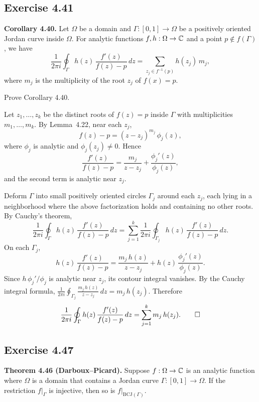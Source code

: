 \documentclass{article}
\begin{document}
\subsection{Exercise 4.41}

\textbf{Corollary 4.40.}
Let $\Omega$ be a domain and $\Gamma : [0, 1] \to \Omega$ be a
positively oriented Jordan curve inside $\Omega$.  For analytic
functions $f, h : \Omega \to \mathbb{C}$ and a point $p \notin f(\Gamma)$, we
have
\[
  \frac{1}{2\pi i} \oint_\Gamma h(z)\,\frac{f'(z)}{f(z) - p}\,dz
  = \sum_{z_j \in f^{-1}(p)} h(z_j)\,m_j,
\]
where $m_j$ is the multiplicity of the root $z_j$ of $f(x) = p$.

Prove Corollary 4.40.

\begin{solution}
  Let $z_1, \ldots, z_k$ be the distinct roots of $f(z) = p$
  inside $\Gamma$ with multiplicities $m_1, \ldots, m_k$.
  By Lemma~4.22, near each $z_j$,
  \[
    f(z) - p = (z - z_j)^{m_j}\,\phi_j(z),
  \]
  where $\phi_j$ is analytic and $\phi_j(z_j) \ne 0$.
  Hence
  \[
    \frac{f'(z)}{f(z) - p}
    = \frac{m_j}{z - z_j} + \frac{\phi_j'(z)}{\phi_j(z)},
  \]
  and the second term is analytic near $z_j$.

  Deform $\Gamma$ into small positively oriented circles
  $\Gamma_j$ around each $z_j$, each lying in a neighborhood
  where the above factorization holds and containing no other
  roots.  By Cauchy's theorem,
  \[
    \frac{1}{2\pi i}\oint_\Gamma h(z)\,\frac{f'(z)}{f(z)-p}\,dz
    = \sum_{j=1}^{k}
      \frac{1}{2\pi i}\oint_{\Gamma_j}
      h(z)\,\frac{f'(z)}{f(z)-p}\,dz.
  \]
  On each $\Gamma_j$,
  \[
    h(z)\,\frac{f'(z)}{f(z) - p}
    = \frac{m_j\,h(z)}{z - z_j}
    + h(z)\,\frac{\phi_j'(z)}{\phi_j(z)}.
  \]
  Since $h\,\phi_j'/\phi_j$ is analytic near $z_j$,
  its contour integral vanishes.
  By the Cauchy integral formula,
  $\frac{1}{2\pi i}\oint_{\Gamma_j} \frac{m_j\,h(z)}{z - z_j}\,dz
  = m_j\,h(z_j)$.
  Therefore
  \[
    \frac{1}{2\pi i}\oint_\Gamma
    h(z)\,\frac{f'(z)}{f(z) - p}\,dz
    = \sum_{j=1}^{k} m_j\,h(z_j).\qedhere
  \]
\end{solution}

\subsection{Exercise 4.47}

\textbf{Theorem 4.46 (Darboux--Picard).}
Suppose $f : \Omega \to \mathbb{C}$ is an analytic function where $\Omega$ is
a domain that contains a Jordan curve $\Gamma : [0, 1] \to \Omega$.
If the restriction $f|_\Gamma$ is injective, then so is
$f|_{\mathrm{BCJ}(\Gamma)}$.
\end{document}
